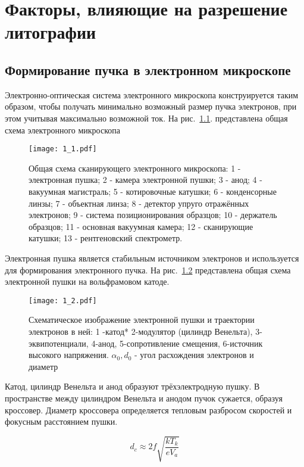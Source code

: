 \chapter{Факторы, влияющие на разрешение литографии}
\section{Формирование пучка в электронном микроскопе}

Электронно-оптическая система электронного микроскопа конструируется таким образом, чтобы получать минимально возможный размер пучка электронов, при этом учитывая максимально возможной ток. На рис.~\ref{fig:1}. представлена общая схема электронного микроскопа

\begin{figure}[H]
\center
\texttt{[image: 1\_1.pdf]}
\caption{Общая схема сканирующего электронного микроскопа: 1 - электронная пушка; 2 - камера электронной пушки; 3 - анод; 4 - вакуумная магистраль; 5 - котировочные катушки; 6 - конденсорные линзы; 7 - объектная линза; 8 - детектор упруго отражённых электронов; 9 - система позиционирования образцов; 10 - держатель образцов; 11 - основная вакуумная камера; 12 - сканирующие катушки; 13 - рентгеновский спектрометр.}
\label{fig:1}
\end{figure}

Электронная пушка является стабильным источником электронов и используется для формирования электронного пучка. На рис.~\ref{fig:2} представлена общая схема электронной пушки на вольфрамовом катоде.

\begin{figure}[H]
\center
\texttt{[image: 1\_2.pdf]}
\caption{ Схематическое изображение электронной пушки и траектории электронов в ней: 1 -катод* 2-модулятор (цилиндр Венельта), 3- эквипотенциали, 4-анод, 5-сопротивление смещения, 6-источник высокого напряжения. $\alpha_0, d_0$ - угол расхождения электронов и диаметр}
\label{fig:2}
\end{figure}

Катод, цилиндр Венельта и анод образуют трёхэлектродную пушку. В пространстве между цилиндром Венельта и анодом пучок сужается, образуя кроссовер.
Диаметр кроссовера определяется тепловым разбросом скоростей и фокусным расстоянием пушки.

\begin{equation}
d_c \approx 2f \sqrt{\frac{kT_k}{eV_a}}
\label{eq:A1}
\end{equation}

